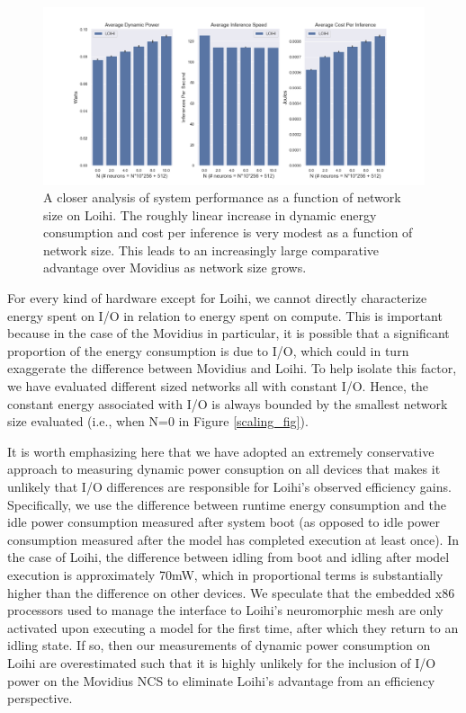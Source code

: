 \documentclass{article}
\begin{document}
\begin{figure}[ht!]
\centering
    \includegraphics[width=6.7in]{./figures/loihi_summary.png}
    \caption{A closer analysis of system performance as a function of network size on Loihi. The roughly linear increase in dynamic energy consumption and cost per inference is very modest as a function of network size. This leads to an increasingly large comparative advantage over Movidius as network size grows.}
\label{loihi_fig}
\end{figure}

For every kind of hardware except for Loihi, we cannot directly characterize energy spent on I/O in relation to energy spent on compute. This is important because in the case of the Movidius in particular, it is possible that a significant proportion of the energy consumption is due to I/O, which could in turn exaggerate the difference between Movidius and Loihi. To help isolate this factor, we have evaluated different sized networks all with constant I/O. Hence, the constant energy associated with I/O is always bounded by the smallest network size evaluated (i.e., when N=0 in Figure \ref{scaling_fig}).

It is worth emphasizing here that we have adopted an extremely conservative approach to measuring dynamic power consuption on all devices that makes it unlikely that I/O differences are responsible for Loihi's observed efficiency gains. Specifically, we use the difference between runtime energy consumption and the idle power consumption measured after system boot (as opposed to idle power consumption measured after the model has completed execution at least once). In the case of Loihi, the difference between idling from boot and idling after model execution is approximately 70mW, which in proportional terms is substantially higher than the difference on other devices. We speculate that the embedded x86 processors used to manage the interface to Loihi's neuromorphic mesh are only activated upon executing a model for the first time, after which they return to an idling state. If so, then our measurements of dynamic power consumption on Loihi are overestimated such that it is highly unlikely for the inclusion of I/O power on the Movidius NCS to eliminate Loihi's advantage from an efficiency perspective. 
\end{document}
